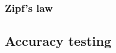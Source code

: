 
\subsubsection{Zipf's law} %
\label{ssub:zipflaw}


\subsection{Accuracy testing} %
\label{sub:accuracy-testing}



